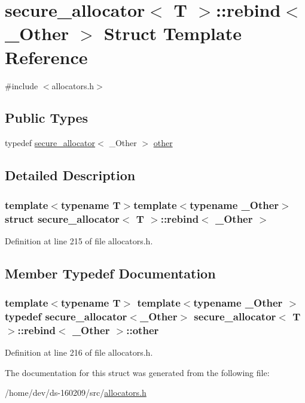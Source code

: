 \hypertarget{structsecure__allocator_1_1rebind}{}\section{secure\+\_\+allocator$<$ T $>$\+:\+:rebind$<$ \+\_\+\+Other $>$ Struct Template Reference}
\label{structsecure__allocator_1_1rebind}


{\ttfamily \#include $<$allocators.\+h$>$}

\subsection*{Public Types}
\begin{DoxyCompactItemize}
\item 
typedef \hyperlink{structsecure__allocator}{secure\+\_\+allocator}$<$ \+\_\+\+Other $>$ \hyperlink{structsecure__allocator_1_1rebind_aa0688d32e40d8ae116efec5946f1a3b5}{other}
\end{DoxyCompactItemize}


\subsection{Detailed Description}
\subsubsection*{template$<$typename T$>$template$<$typename \+\_\+\+Other$>$struct secure\+\_\+allocator$<$ T $>$\+::rebind$<$ \+\_\+\+Other $>$}



Definition at line 215 of file allocators.\+h.



\subsection{Member Typedef Documentation}
\hypertarget{structsecure__allocator_1_1rebind_aa0688d32e40d8ae116efec5946f1a3b5}{}
\subsubsection[{other}]{\setlength{\rightskip}{0pt plus 5cm}template$<$typename T$>$ template$<$typename \+\_\+\+Other $>$ typedef {\bf secure\+\_\+allocator}$<$\+\_\+\+Other$>$ {\bf secure\+\_\+allocator}$<$ T $>$\+::{\bf rebind}$<$ \+\_\+\+Other $>$\+::{\bf other}}\label{structsecure__allocator_1_1rebind_aa0688d32e40d8ae116efec5946f1a3b5}


Definition at line 216 of file allocators.\+h.



The documentation for this struct was generated from the following file\+:\begin{DoxyCompactItemize}
\item 
/home/dev/ds-\/160209/src/\hyperlink{allocators_8h}{allocators.\+h}\end{DoxyCompactItemize}
